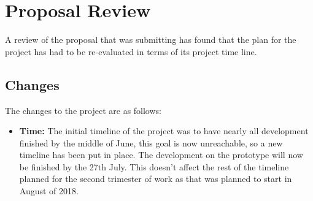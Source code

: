 \chapter{Proposal Review}\label{C:propreview}
A review of the proposal that was submitting has found that the plan for the project has had to be re-evaluated in terms of its project time line. 
\section{Changes}
The changes to the project are as follows:
\begin{itemize}
\item \textbf{Time:} The initial timeline of the project was to have nearly all development finished by the middle of June, this goal is now unreachable, so a new timeline has been put in place. 
The development on the prototype will now be finished by the 27th July. This doesn't affect the rest of the timeline planned for the second trimester of work as that was planned to start in August of 2018.
\end{itemize}